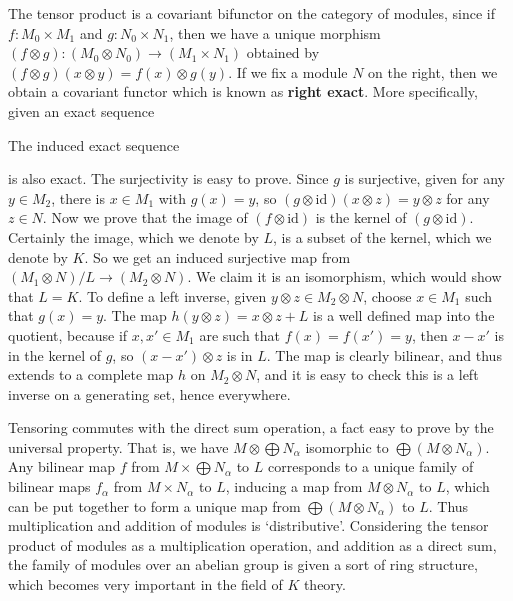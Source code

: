 The tensor product is a covariant bifunctor on the category of modules, since if $f: M_0 \times M_1$ and $g: N_0 \times N_1$, then we have a unique morphism $(f \otimes g): (M_0 \otimes N_0) \to (M_1 \times N_1)$ obtained by $(f \otimes g)(x \otimes y) = f(x) \otimes g(y)$. If we fix a module $N$ on the right, then we obtain a covariant functor which is known as {\bf right exact}. More specifically, given an exact sequence
%
\begin{center}
\end{center}
%
The induced exact sequence
%
\begin{center}
\end{center}
%
is also exact. The surjectivity is easy to prove. Since $g$ is surjective, given for any $y \in M_2$, there is $x \in M_1$ with $g(x) = y$, so $(g \otimes \text{id})(x \otimes z) = y \otimes z$ for any $z \in N$. Now we prove that the image of $(f \otimes \text{id})$ is the kernel of $(g \otimes \text{id})$. Certainly the image, which we denote by $L$, is a subset of the kernel, which we denote by $K$. So we get an induced surjective map from $(M_1 \otimes N)/L \to (M_2 \otimes N)$. We claim it is an isomorphism, which would show that $L = K$. To define a left inverse, given $y \otimes z \in M_2 \otimes N$, choose $x \in M_1$ such that $g(x) = y$. The map $h(y \otimes z) = x \otimes z + L$ is a well defined map into the quotient, because if $x,x' \in M_1$ are such that $f(x) = f(x') = y$, then $x - x'$ is in the kernel of $g$, so $(x - x') \otimes z$ is in $L$. The map is clearly bilinear, and thus extends to a complete map $h$ on $M_2 \otimes N$, and it is easy to check this is a left inverse on a generating set, hence everywhere.

Tensoring commutes with the direct sum operation, a fact easy to prove by the universal property. That is, we have $M \otimes \bigoplus N_\alpha$ isomorphic to $\bigoplus (M \otimes N_\alpha)$. Any bilinear map $f$ from $M \times \bigoplus N_\alpha$ to $L$ corresponds to a unique family of bilinear maps $f_\alpha$ from $M \times N_\alpha$ to $L$, inducing a map from $M \otimes N_\alpha$ to $L$, which can be put together to form a unique map from $\bigoplus (M \otimes N_\alpha)$ to $L$. Thus multiplication and addition of modules is `distributive'. Considering the tensor product of modules as a multiplication operation, and addition as a direct sum, the family of modules over an abelian group is given a sort of ring structure, which becomes very important in the field of $K$ theory.


